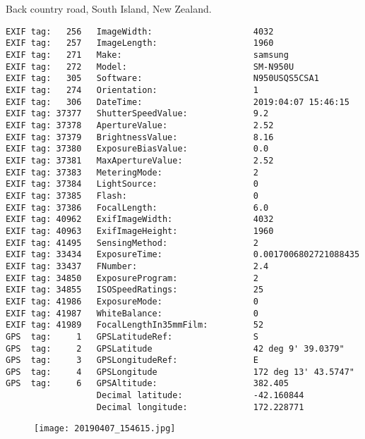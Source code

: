\section{\protect{}}
\noindent Back country road, South Island, New Zealand.
\noindent
\begin{lstlisting}
EXIF tag:   256   ImageWidth:                    4032
EXIF tag:   257   ImageLength:                   1960
EXIF tag:   271   Make:                          samsung
EXIF tag:   272   Model:                         SM-N950U
EXIF tag:   305   Software:                      N950USQS5CSA1
EXIF tag:   274   Orientation:                   1
EXIF tag:   306   DateTime:                      2019:04:07 15:46:15
EXIF tag: 37377   ShutterSpeedValue:             9.2
EXIF tag: 37378   ApertureValue:                 2.52
EXIF tag: 37379   BrightnessValue:               8.16
EXIF tag: 37380   ExposureBiasValue:             0.0
EXIF tag: 37381   MaxApertureValue:              2.52
EXIF tag: 37383   MeteringMode:                  2
EXIF tag: 37384   LightSource:                   0
EXIF tag: 37385   Flash:                         0
EXIF tag: 37386   FocalLength:                   6.0
EXIF tag: 40962   ExifImageWidth:                4032
EXIF tag: 40963   ExifImageHeight:               1960
EXIF tag: 41495   SensingMethod:                 2
EXIF tag: 33434   ExposureTime:                  0.0017006802721088435
EXIF tag: 33437   FNumber:                       2.4
EXIF tag: 34850   ExposureProgram:               2
EXIF tag: 34855   ISOSpeedRatings:               25
EXIF tag: 41986   ExposureMode:                  0
EXIF tag: 41987   WhiteBalance:                  0
EXIF tag: 41989   FocalLengthIn35mmFilm:         52
GPS  tag:     1   GPSLatitudeRef:                S
GPS  tag:     2   GPSLatitude                    42 deg 9' 39.0379"
GPS  tag:     3   GPSLongitudeRef:               E
GPS  tag:     4   GPSLongitude                   172 deg 13' 43.5747"
GPS  tag:     6   GPSAltitude:                   382.405
                  Decimal latitude:              -42.160844
                  Decimal longitude:             172.228771

\end{lstlisting}
\clearpage
\begin{figure}
\raggedleft
\texttt{[image: 20190407\_154615.jpg]}
\end{figure}


\clearpage
